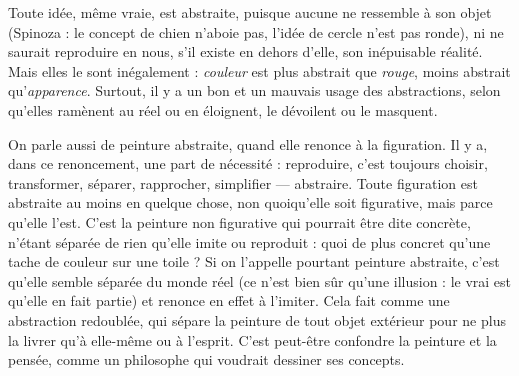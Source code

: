 Toute idée, même vraie, est abstraite, puisque aucune ne ressemble à son
objet (Spinoza : le concept de chien n’aboie pas, l’idée de cercle n'est pas
ronde), ni ne saurait reproduire en nous, s’il existe en dehors d’elle, son inépuisable 
réalité. Mais elles le sont inégalement : {\it couleur} est plus abstrait que {\it rouge},
moins abstrait qu’{\it apparence}. Surtout, il y a un bon et un mauvais usage des abstractions,
selon qu’elles ramènent au réel ou en éloignent, le dévoilent ou le
masquent.

On parle aussi de peinture abstraite, quand elle renonce à la figuration. Il y
a, dans ce renoncement, une part de nécessité : reproduire, c’est toujours
choisir, transformer, séparer, rapprocher, simplifier — abstraire. Toute figuration
est abstraite au moins en quelque chose, non quoiqu’elle soit figurative,
mais parce qu’elle l'est. C’est la peinture non figurative qui pourrait être dite
concrète, n'étant séparée de rien qu’elle imite ou reproduit : quoi de plus
concret qu'une tache de couleur sur une toile ? Si on l'appelle pourtant peinture
abstraite, c’est qu’elle semble séparée du monde réel (ce n’est bien sûr
qu'une illusion : le vrai est qu’elle en fait partie) et renonce en effet à l’imiter.
Cela fait comme une abstraction redoublée, qui sépare la peinture de tout objet
extérieur pour ne plus la livrer qu’à elle-même ou à l'esprit. C’est peut-être
confondre la peinture et la pensée, comme un philosophe qui voudrait dessiner
ses concepts.


